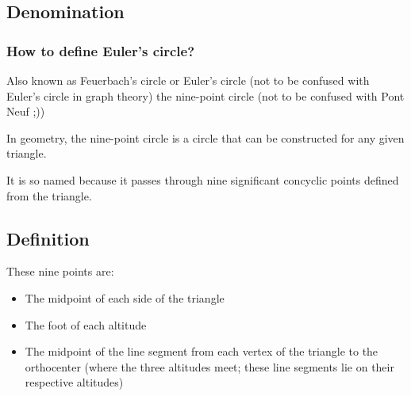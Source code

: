\documentclass{beamer}
\begin{document}
\subsection{Denomination}
    \begin{frame}
    	\frametitle{How to define Euler's circle?}
 

     Also known as Feuerbach's circle or Euler's circle
(not to be confused with Euler’s circle in graph theory)
the nine-point circle  (not to be confused with Pont Neuf ;))   \par  

    In geometry, the nine-point circle is a circle
that can be constructed for any given triangle. \par

    It is so named because it passes through
nine significant concyclic points defined from the triangle.


    \end{frame}

\subsection{Definition}

	\begin{frame}

 These nine points are:

    		\begin{itemize}
        		\item The midpoint of each side of the triangle
        		\pause
        		\item The foot of each altitude
        		\pause
        		\item The midpoint of the line segment from each vertex of the triangle to the orthocenter
        (where the three altitudes meet; these line segments lie on their respective altitudes)     
    		\end{itemize}


	\end{frame}
\end{document}
